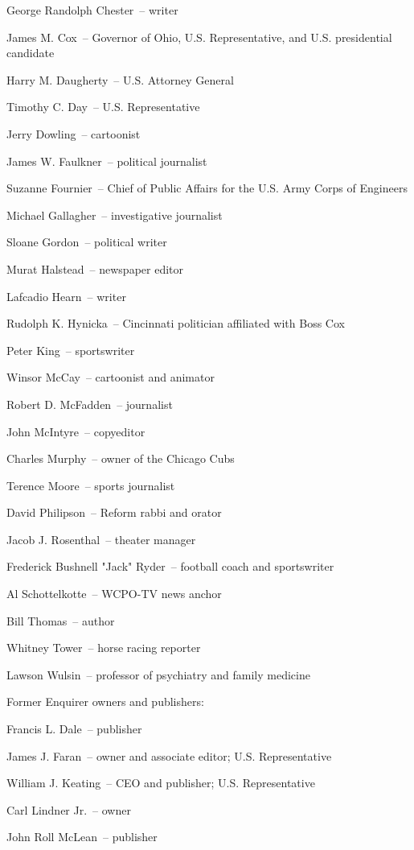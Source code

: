George Randolph Chester~-- writer

James M. Cox~-- Governor of Ohio, U.S. Representative, and U.S.
presidential candidate

Harry M. Daugherty~-- U.S. Attorney General

Timothy C. Day~-- U.S. Representative

Jerry Dowling~-- cartoonist

James W. Faulkner~-- political journalist

Suzanne Fournier~-- Chief of Public Affairs for the U.S. Army Corps of
Engineers

Michael Gallagher~-- investigative journalist

Sloane Gordon~-- political writer

Murat Halstead~-- newspaper editor

Lafcadio Hearn~-- writer

Rudolph K. Hynicka~-- Cincinnati politician affiliated with Boss Cox

Peter King~-- sportswriter

Winsor McCay~-- cartoonist and animator

Robert D. McFadden~-- journalist

John McIntyre~-- copyeditor

Charles Murphy~-- owner of the Chicago Cubs

Terence Moore~-- sports journalist

David Philipson~-- Reform rabbi and orator

Jacob J. Rosenthal~-- theater manager

Frederick Bushnell "Jack" Ryder~-- football coach and sportswriter

Al Schottelkotte~-- WCPO-TV news anchor

Bill Thomas~-- author

Whitney Tower~-- horse racing reporter

Lawson Wulsin~-- professor of psychiatry and family medicine

Former Enquirer owners and publishers:

Francis L. Dale~-- publisher

James J. Faran~-- owner and associate editor; U.S. Representative

William J. Keating~-- CEO and publisher; U.S. Representative

Carl Lindner Jr.~-- owner

John Roll McLean~-- publisher

